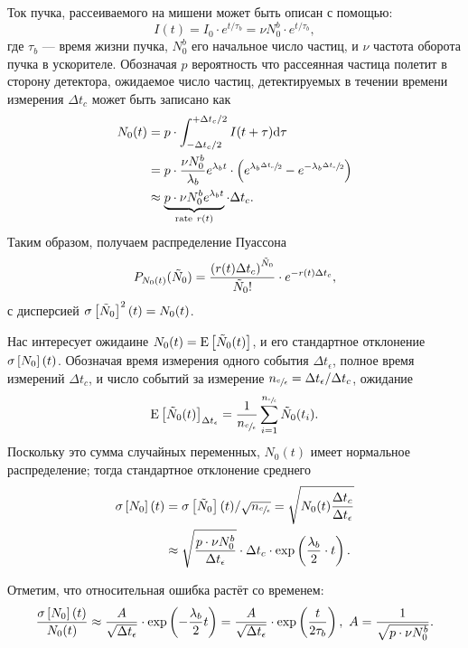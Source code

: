 \documentclass{report}
\newcommand{\td}{\mathrm{d}}
\newcommand{\cnt}{c}
\newcommand{\meas}{\epsilon}
\newcommand{\dt}{\Delta t}
\newcommand{\dtm}{\dt_{\meas}}
\newcommand{\dtc}{\dt_{\cnt}}
\newcommand{\Ncm}{{n_{\sfrac{\cnt}{\meas}}}}
\newcommand{\LTb}{\tau_b}
\newcommand{\lamb}{\lambda_b}
\begin{document}
Ток пучка, рассеиваемого на мишени может быть описан с помощью:
\[
I(t)= I_0\cdot e^{t/\LTb} = \nu N_0^b\cdot e^{t/\LTb},
\]
где $\LTb$ --- время жизни пучка, $N_0^b$ его начальное число частиц,
и $\nu$ частота оборота пучка в ускорителе. Обозначая $p$ вероятность
что рассеянная частица полетит в сторону детектора, ожидаемое число
частиц, детектируемых в течении времени измерения $\dtc$ может быть
записано как
\begin{align}
N_0(t) & = p\cdot\int_{-\dtc/2}^{+\dtc/2} I(t+\tau)\td\tau \notag                    \\
& = p\cdot\frac{\nu N_0^b}{\lamb} e^{\lamb t}\cdot \bkt{e^{\lamb\sfrac{\dtc}{2}} - e^{-\lamb\sfrac{\dtc}{2}}} \notag \\
& \approx \underbrace{p\cdot\nu N_0^b e^{\lamb t}}_{\text{rate}~r(t)} \cdot\dtc.
\end{align}
Таким образом, получаем распределение Пуассона
\[
	P_{N_0(t)}(\tilde{N}_0) = \frac{\bkt{r(t)\dtc}^{\tilde{N}_0}}{\tilde{N}_0!}\cdot e^{-r(t)\dtc},
\]
с дисперсией $\SD{\tilde{N}_0}^2(t) = N_0(t)$. %

Нас интересует ожидаине $N_0(t) = \Xpct{\tilde{N}_0(t)}$, и его
стандартное отклонение $\SD{N_0}(t)$. Обозначая время измерения одного
события $\dtm$, полное время измерений $\dtc$, и число событий за
измерение $\Ncm = \dtm/\dtc$, ожидание
\begin{equation*}
	\Xpct{\tilde{N}_0(t)}_{\dtm} = \frac{1}{\Ncm}\sum_{i=1}^\Ncm \tilde{N}_0(t_i).
\end{equation*}
Поскольку это сумма случайных переменных, $N_0(t)$ имеет нормальное
распределение; тогда стандартное отклонение среднего %
\begin{align*}
\SD{N_0}(t) & = \SD{\tilde{N}_0}(t)/\sqrt{\Ncm} = \sqrt{N_0(t)\frac{\dtc}{\dtm}}            \\
& \approx \sqrt{\frac{p\cdot\nu N_0^b}{\dtm}}\cdot\dtc \cdot\exp\bkt{\frac{\lamb}{2}\cdot t}.
\end{align*}
\newcommand{\A}{\frac{1}{\sqrt{p\cdot\nu N_0^b}}}

Отметим, что относительная ошибка растёт со временем:
\begin{equation}\label{eq:MeasRelErr}
	\frac{\SD{N_0}(t)}{N_0(t)} \approx \frac{A}{\sqrt{\dtm}}\cdot\exp\bkt{-\frac{\lamb}{2}t} = \frac{A}{\sqrt{\dtm}}\cdot\exp\bkt{\frac{t}{2\LTb}},~ A=\A.
\end{equation}
\end{document}
